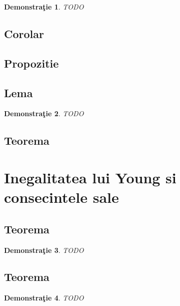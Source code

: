 \documentclass[a4paper,12pt,oneside]{report}
\newtheorem{demonstration}{Demonstra\c tie}
\begin{document}
\begin{demonstration}
TODO	
\end{demonstration}


\subsection{Corolar}

\subsection{Propozitie}

\subsection{Lema}

\begin{demonstration}
TODO	
\end{demonstration}


\subsection{Teorema}


\section{Inegalitatea lui Young si consecintele sale}

\subsection{Teorema}


\begin{demonstration}
TODO	
\end{demonstration}

\subsection{Teorema}

\begin{demonstration}
TODO	
\end{demonstration}



%
%
%
%
\end{document}
